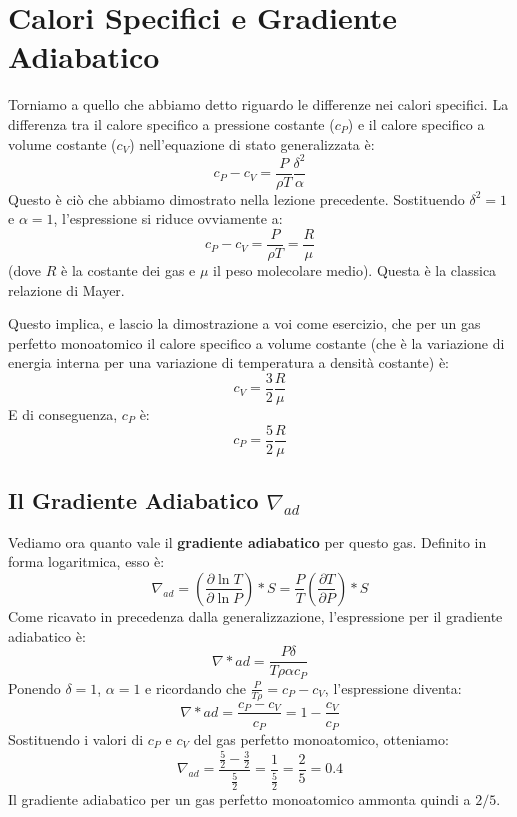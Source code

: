 \section{Calori Specifici e Gradiente Adiabatico}

Torniamo a quello che abbiamo detto riguardo le differenze nei calori specifici. La differenza tra il calore specifico a pressione costante ($c_P$) e il calore specifico a volume costante ($c_V$) nell'equazione di stato generalizzata è:
\begin{equation}
c_P - c_V = \frac{P}{\rho T} \frac{\delta^2}{\alpha}
\end{equation}
Questo è ciò che abbiamo dimostrato nella lezione precedente. Sostituendo $\delta^2 = 1$ e $\alpha = 1$, l'espressione si riduce ovviamente a:
\begin{equation}
c_P - c_V = \frac{P}{\rho T} = \frac{R}{\mu}
\end{equation}
(dove $R$ è la costante dei gas e $\mu$ il peso molecolare medio). Questa è la classica relazione di Mayer.

Questo implica, e lascio la dimostrazione a voi come esercizio, che per un gas perfetto monoatomico il calore specifico a volume costante (che è la variazione di energia interna per una variazione di temperatura a densità costante) è:
\begin{equation}
c_V = \frac{3}{2} \frac{R}{\mu}
\end{equation}
E di conseguenza, $c_P$ è:
\begin{equation}
c_P = \frac{5}{2} \frac{R}{\mu}
\end{equation}

\subsection{Il Gradiente Adiabatico $\nabla_{ad}$}
Vediamo ora quanto vale il \textbf{gradiente adiabatico} per questo gas. Definito in forma logaritmica, esso è:
\begin{equation}
\nabla_{ad} = \left( \frac{\partial \ln T}{\partial \ln P} \right)*S = \frac{P}{T} \left( \frac{\partial T}{\partial P} \right)*S
\end{equation}
Come ricavato in precedenza dalla generalizzazione, l'espressione per il gradiente adiabatico è:
\begin{equation}
\nabla*{ad} = \frac{P \delta}{T \rho \alpha c_P}
\end{equation}
Ponendo $\delta=1$, $\alpha=1$ e ricordando che $\frac{P}{T \rho} = c_P - c_V$, l'espressione diventa:
\begin{equation}
\nabla*{ad} = \frac{c_P - c_V}{c_P} = 1 - \frac{c_V}{c_P}
\end{equation}
Sostituendo i valori di $c_P$ e $c_V$ del gas perfetto monoatomico, otteniamo:
\begin{equation}
\nabla_{ad} = \frac{\frac{5}{2} - \frac{3}{2}}{\frac{5}{2}} = \frac{1}{\frac{5}{2}} = \frac{2}{5} = 0.4
\end{equation}
Il gradiente adiabatico per un gas perfetto monoatomico ammonta quindi a $2/5$.

